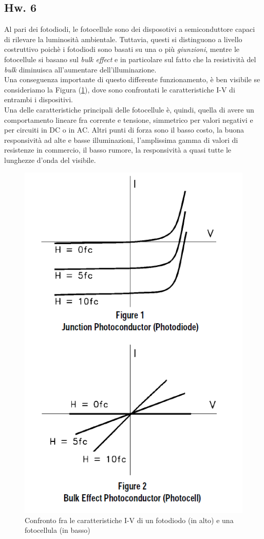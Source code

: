\documentclass[journal, a4paper]{IEEEtran}
\begin{document}
\subsection{Hw. 6}
Al pari dei fotodiodi, le fotocellule sono dei disposotivi a semiconduttore capaci di rilevare la luminosità ambientale. Tuttavia, questi si distinguono a livello costruttivo poichè i fotodiodi sono basati su una o più \textit{giunzioni}, mentre le fotocellule si basano sul \textit{bulk effect} e in particolare sul fatto che la resistività del \textit{bulk} diminuisca all'aumentare dell'illuminazione. \\
Una conseguenza importante di questo differente funzionamento, è ben visibile se consideriamo la Figura (\ref{fig:hw6_compare_pd_pr}), dove sono confrontati le caratteristiche I-V di entrambi i dispositivi.\\ 
Una delle caratteristiche principali delle fotocellule è, quindi, quella di avere un comportamento lineare fra corrente e tensione, simmetrico per valori negativi e per circuiti in DC o in AC. Altri punti di forza sono il basso costo, la buona responsività ad alte e basse illuminazioni, l'amplissima gamma di valori di resistenze in commercio, il basso rumore, la responsività a quasi tutte le lunghezze d'onda del visibile.\\


\begin{figure}
\centering
\includegraphics[width=0.7\linewidth]{./hw6_compare_pd_pr}
\caption{Confronto fra le caratteristiche I-V di un fotodiodo (in alto) e una fotocellula (in basso)}
\label{fig:hw6_compare_pd_pr}
\end{figure}
\end{document}
